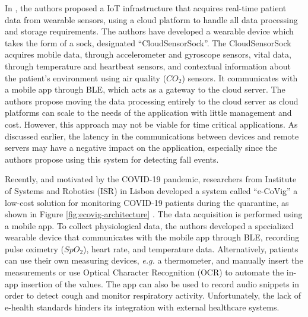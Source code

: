 In \cite{Doukas2012}, the authors proposed a \acs{IoT} infrastructure that acquires real-time patient data from wearable sensors, using a cloud platform to handle all data processing and storage requirements. The authors have developed a wearable device which takes the form of a sock, designated ``CloudSensorSock''. The CloudSensorSock acquires mobile data, through accelerometer and gyroscope sensors, vital data, through temperature and heartbeat sensors, and contextual information about the patient's environment using air quality ($CO_2$) sensors. It communicates with a mobile app through \acs{BLE}, which acts as a gateway to the cloud server. The authors propose moving the data processing entirely to the cloud server as cloud platforms can scale to the needs of the application with little management and cost. However, this approach may not be viable for time critical applications. As discussed earlier, the latency in the communications between devices and remote servers may have a negative impact on the application, especially since the authors propose using this system for detecting fall events. \bigskip

%
%

Recently, and motivated by the COVID-19 pandemic, researchers from Institute of Systems and Robotics (ISR) in Lisbon developed a system called ``e-CoVig'' a low-cost solution for monitoring COVID-19 patients during the quarantine, as shown in Figure \ref{fig:ecovig-architecture} \cite{Raposo2021}. The data acquisition is performed using a mobile app. To collect physiological data, the authors developed a specialized wearable device that communicates with the mobile app through \acs{BLE}, recording pulse oximetry ($SpO_2$), heart rate, and temperature data. Alternatively, patients can use their own measuring devices, \textit{e.g.} a thermometer, and manually insert the measurements or use Optical Character Recognition (OCR) to automate the in-app insertion of the values. The app can also be used to record audio snippets in order to detect cough and monitor respiratory activity. Unfortunately, the lack of e-health standards hinders its integration with external healthcare systems. 

